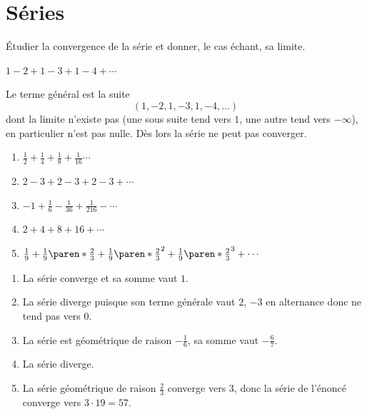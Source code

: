 \documentclass[12pt,french,oneside,a4paper]{memoir} %
\begin{document}
\chapter{Séries}
\begin{exo}
Étudier la convergence de la série et donner, le cas échant, sa limite.
\begin{example}
  $1 - 2 + 1 - 3 + 1 - 4 + \cdots$

  Le terme général est la suite
  \begin{equation*}
    (1,  -2, 1, -3, 1, -4, \ldots)
  \end{equation*}
  dont la limite n'existe pas (une sous suite tend vers $1$, une autre tend vers $-\infty$), en particulier n'est pas nulle. Dès lors la série ne peut pas converger.
\end{example}
\begin{multicols}{2}
  \begin{enumerate}
  \item $\frac12 + \frac 14 + \frac 18 + \frac1{16} \cdots$
  \item $2 - 3 + 2 - 3 + 2 - 3 + \cdots$
  \item $-1 + \frac{1}{6} - \frac{1}{36} + \frac{1}{216} - \cdots$
  \item $2 + 4 + 8 + 16 + \cdots$
  \item $\frac 19 + \frac 19 \paren*{\frac 2 3} + \frac 19 {\paren*{\frac 2 3}}^{2} + \frac 19 {\paren*{\frac 2 3}}^{3} + \cdots$
  \end{enumerate}
\end{multicols}
\begin{correction}
  \begin{enumerate}
  \item La série converge et sa somme vaut $1$.
  \item La série diverge puisque son terme générale vaut $2$, $-3$ en alternance donc ne tend pas vers $0$.
  \item La série est géométrique de raison $-\frac1{6}$, sa somme vaut $-\frac 6 7$.
  \item La série diverge.
  \item La série géométrique de raison $\frac 23$ converge vers $3$, donc la série de l'énoncé converge vers $3\cdot 19 = 57$.
  \end{enumerate}
\end{correction}
\end{exo}
\end{document}

